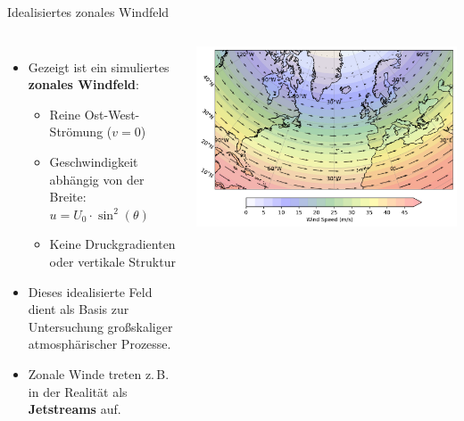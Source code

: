 

\begin{frame}{Idealisiertes zonales Windfeld}
	\begin{columns}
		\begin{itemize}
			\item Gezeigt ist ein simuliertes \textbf{zonales Windfeld}:
			      \begin{itemize}
				      \item Reine Ost-West-Strömung (\(v = 0\))
				      \item Geschwindigkeit abhängig von der Breite: \(u = U_0 \cdot \sin^2(\theta)\)
				      \item Keine Druckgradienten oder vertikale Struktur
			      \end{itemize}
			\item Dieses idealisierte Feld dient als Basis zur Untersuchung großskaliger atmosphärischer Prozesse.
			\item Zonale Winde treten z.\,B. in der Realität als \textbf{Jetstreams} auf.
		\end{itemize}

		\centering
		\includegraphics[width=\linewidth]{../images/zonal_wind_plot.pdf}
	\end{columns}
\end{frame}


